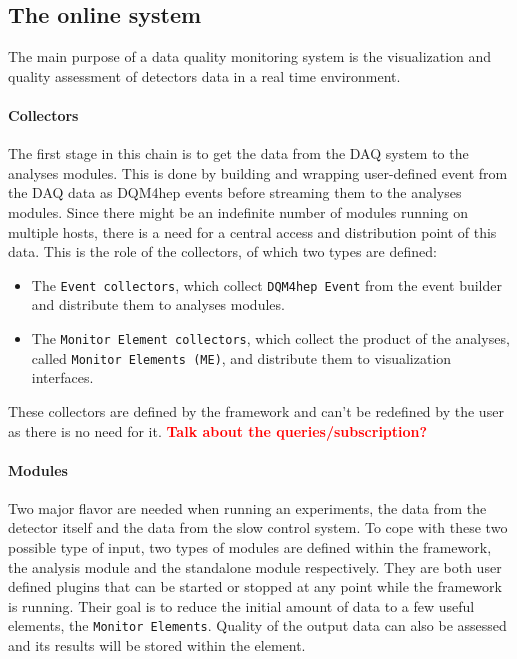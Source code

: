 \documentclass{webofc}
\begin{document}
\subsection{The online system}
\label{subsec:online}
The main purpose of a data quality monitoring system is the visualization and quality assessment of detectors data in a real time environment.

\paragraph{Collectors}\label{par:Collectors}
The first stage in this chain is to get the data from the DAQ system to the analyses modules.
This is done by building and wrapping user-defined event from the DAQ data as DQM4hep events before streaming them to the analyses modules.
Since there might be an indefinite number of modules running on multiple hosts, there is a need for a central access and distribution point of this data. This is the role of the collectors, of which two types are defined:

\begin{itemize}
  \item The \texttt{Event collectors}, which collect \texttt{DQM4hep Event} from the event builder and distribute them to analyses modules.  
  \item The \texttt{Monitor Element collectors}, which collect the product of the analyses, called \texttt{Monitor Elements (ME)}, and distribute them to visualization interfaces.
\end{itemize}
These collectors are defined by the framework and can't be redefined by the user as there is no need for it. 
\textcolor{red}{\textbf{Talk about the queries/subscription?}}


\paragraph{Modules}\label{par:Modules}
Two major flavor are needed when running an experiments, the data from the detector itself and the data from the slow control system.
To cope with these two possible type of input, two types of modules are defined within the framework, the analysis module and the standalone module respectively.
They are both user defined plugins that can be started or stopped at any point while the framework is running. Their goal is to reduce the initial amount of data to a few useful elements, the \texttt{Monitor Elements}. Quality of the output data can also be assessed and its results will be stored within the element.
\end{document}
